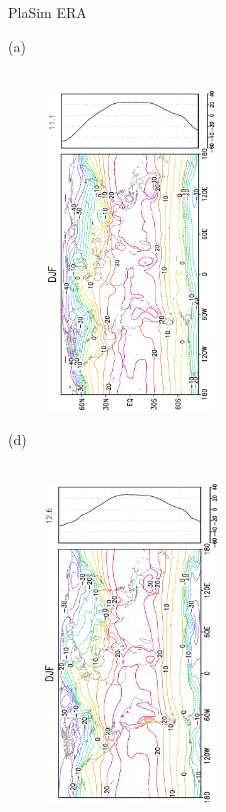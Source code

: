 \documentclass[12pt,a4paper,twoside,openright,headinclude,liststotoc,bibtotoc]{scrreprt}
\begin{document}
\begin{appendix}
\begin{figure}[H]
\hspace{3.1cm}PlaSim \vspace{0.2cm}\hspace{7.1cm} ERA \\
\parbox{8.5cm}{\hspace{0.5cm}\begin{scriptsize}(a)\end{scriptsize} \vspace{-0.5cm} \\
\includegraphics[height=8.5cm,width=6.5cm,angle=-90]
{eps/zonalcelysmT2m167DJF.eps}
}
\parbox{8.5cm}{\hspace{0.25cm}\begin{scriptsize}(d)\end{scriptsize} \vspace{-0.5cm} \\
\includegraphics[height=8.5cm,width=6.5cm,angle=-90]
{eps/zonalcelt21ysmt2mDJF.eps}
}
\end{figure}
\end{appendix}
\end{document}
